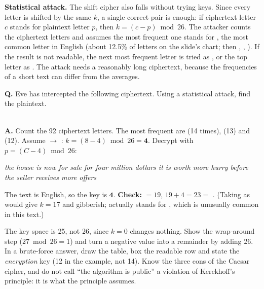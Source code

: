 \textbf{Statistical attack.} The shift cipher also falls without trying keys. Since every letter is shifted by the same $k$, a single correct pair is enough: if ciphertext letter $c$ stands for plaintext letter $p$, then $k = (c - p) \bmod 26$. The attacker counts the ciphertext letters and assumes the most frequent one stands for , the most common letter in English (about 12.5\% of letters on the slide's chart; then , , ). If the result is not readable, the next most frequent letter is tried as , or the top letter as . The attack needs a reasonably long ciphertext, because the frequencies of a short text can differ from the averages.

\begin{worked}
\textbf{Q.} Eve has intercepted the following ciphertext. Using a statistical attack, find the plaintext.\\
\\

\textbf{A.} Count the 92 ciphertext letters. The most frequent are  (14 times),  (13) and  (12). Assume  $\to$ : $k = (8 - 4) \bmod 26 = \mathbf{4}$. Decrypt with $p = (C - 4) \bmod 26$:
\begin{center}\small
\emph{the house is now for sale for four million dollars it is worth more hurry before the seller receives more offers}
\end{center}
The text is English, so the key is $\mathbf{4}$. \textbf{Check:}  $= 19$, $19 + 4 = 23 = $  \checkmark. (Taking  as  would give $k = 17$ and gibberish;  actually stands for , which is unusually common in this text.)
\end{worked}

\begin{trap}
The key space is 25, not 26, since $k = 0$ changes nothing. Show the wrap-around step ($27 \bmod 26 = 1$) and turn a negative value into a remainder by adding 26. In a brute-force answer, draw the table, box the readable row and state the \emph{encryption} key (12 in the  example, not 14). Know the three cons of the Caesar cipher, and do not call ``the algorithm is public'' a violation of Kerckhoff's principle: it is what the principle assumes.
\end{trap}

